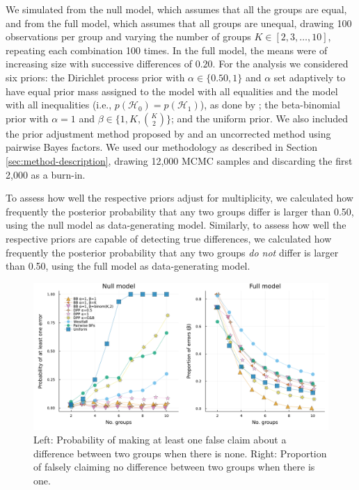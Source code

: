 \documentclass[11pt,a4paper]{article}
\theoremstyle{definition} %
\theoremstyle{case}
\newcommand{\FD}[1]{\textcolor{red}{Fabian: #1 }}
\begin{document}
We simulated from the null model, which assumes that all the groups are equal, and from the full model, which assumes that all groups are unequal, drawing 100 observations per group and varying the number of groups $K \in [2, 3, \dots, 10]$, repeating each combination 100 times. In the full model, the means were of increasing size with successive differences of $0.20$. For the analysis we considered six priors: the Dirichlet process prior with $\alpha \in \{0.50, 1\}$ and $\alpha$ set adaptively to have equal prior mass assigned to the model with all equalities and the model with all inequalities (i.e., $p(\mathcal{H}_0) = p(\mathcal{H}_1)$), as done by \textcite{gopalan1998bayesian}; the beta-binomial prior with $\alpha = 1$ and $\beta \in \{1, K, {K \choose 2}\}$; and the uniform prior. We also included the prior adjustment method proposed by \textcite{westfall1997bayesian} and an uncorrected method using pairwise Bayes factors. We used our methodology as described in Section \ref{sec:method-description}, drawing 12,000 MCMC samples and discarding the first 2,000 as a burn-in.

To assess how well the respective priors adjust for multiplicity, we calculated how frequently the posterior probability that any two groups differ is larger than 0.50, using the null model as data-generating model. Similarly, to assess how well the respective priors are capable of detecting true differences, we calculated how frequently the posterior probability that any two groups \textit{do not} differ is larger than 0.50, using the full model as data-generating model.

\begin{figure}
    \centering
    \includegraphics[width=1\textwidth]{figures/2_panel_alpha_familywise.pdf}
    \caption{Left: Probability of making at least one false claim about a difference between two groups when there is none. Right: Proportion of falsely claiming no difference between two groups when there is one. %
    }
    \label{fig:small_simulation}
\end{figure}
\end{document}

